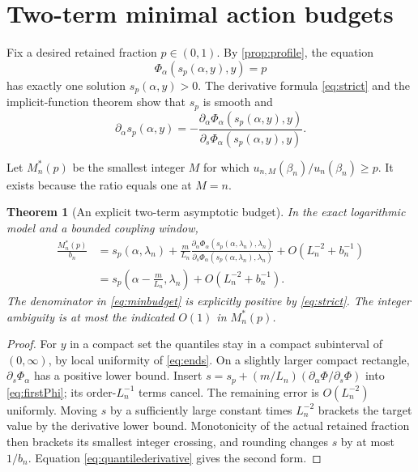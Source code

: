 \documentclass[11pt,a4paper]{article}
\numberwithin{equation}{section}
\newtheorem{theorem}{Theorem}[section]
\theoremstyle{definition}\newtheorem{definition}[theorem]{Definition}
\theoremstyle{remark}\newtheorem{remark}[theorem]{Remark}
\theoremstyle{definition}
\begin{document}
\section{Two-term minimal action budgets}
\label{sec:quantiles}

Fix a desired retained fraction $p\in(0,1)$. By \cref{prop:profile}, the
equation
\begin{equation}\label{eq:quantile}
 \Phi_\alpha(s_p(\alpha,y),y)=p
\end{equation}
has exactly one solution $s_p(\alpha,y)>0$. The derivative formula
\eqref{eq:strict} and the implicit-function theorem show that $s_p$ is
smooth and
\begin{equation}\label{eq:quantilederivative}
 \partial_\alpha s_p(\alpha,y)
 =-\frac{\partial_\alpha\Phi_\alpha(s_p(\alpha,y),y)}
         {\partial_s\Phi_\alpha(s_p(\alpha,y),y)}.
\end{equation}

Let $M_n^*(p)$ be the smallest integer $M$ for which
$u_{n,M}(\beta_n)/u_n(\beta_n)\ge p$. It exists because the ratio equals
one at $M=n$.

\begin{theorem}[An explicit two-term asymptotic budget]\label{thm:minbudget}
In the exact logarithmic model and a bounded coupling window,
\begin{align}
 \frac{M_n^*(p)}{b_n}
 &=s_p(\alpha,\lambda_n)
 +\frac m{L_n}
 \frac{\partial_\alpha\Phi_\alpha(s_p(\alpha,\lambda_n),\lambda_n)}
      {\partial_s\Phi_\alpha(s_p(\alpha,\lambda_n),\lambda_n)}
 +O(L_n^{-2}+b_n^{-1})\label{eq:minbudget}\\
 &=s_p\!\left(\alpha-\frac m{L_n},\lambda_n\right)
 +O(L_n^{-2}+b_n^{-1}).\label{eq:minbudgeteff}
\end{align}
The denominator in \eqref{eq:minbudget} is explicitly positive by
\eqref{eq:strict}. The integer ambiguity is at most the indicated
$O(1)$ in $M_n^*(p)$.
\end{theorem}
\begin{proof}
For $y$ in a compact set the quantiles stay in a compact subinterval of
$(0,\infty)$, by local uniformity of \eqref{eq:ends}. On a slightly larger
compact rectangle, $\partial_s\Phi_\alpha$ has a positive lower bound.
Insert
$s=s_p+(m/L_n)(\partial_\alpha\Phi/\partial_s\Phi)$ into
\eqref{eq:firstPhi}; its order-$L_n^{-1}$ terms cancel. The remaining
error is $O(L_n^{-2})$ uniformly. Moving $s$ by a sufficiently large
constant times $L_n^{-2}$ brackets the target value by the derivative
lower bound. Monotonicity of the actual retained fraction then brackets
its smallest integer crossing, and rounding changes $s$ by at most
$1/b_n$. Equation \eqref{eq:quantilederivative} gives the second form.
\end{proof}
\end{document}
